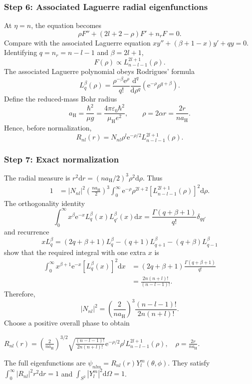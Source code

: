 \documentclass[11pt,a4paper]{article}
\newcommand{\key}[1]{\begin{resultbox}\centering\(\displaystyle #1\)\end{resultbox}}
\newcommand{\dd}{\mathrm{d}}
\newcommand{\ee}{\mathrm{e}}
\newcommand{\aH}{a_{\mathrm H}}
\newcommand{\mH}{\mu_{\mathrm H}}
\newcommand{\eps}{\varepsilon_0}
\begin{document}
\subsubsection*{Step 6: Associated Laguerre radial eigenfunctions}
At \(\eta=n\), the equation becomes
\begin{equation}\rho F''+(2l+2-\rho)F'+n_rF=0.\end{equation}
Compare with the associated Laguerre equation \(x y''+(\beta+1-x)y'+qy=0\). Identifying \(q=n_r=n-l-1\) and \(\beta=2l+1\),
\begin{equation}F(\rho)\propto L_{n-l-1}^{2l+1}(\rho).\end{equation}
The associated Laguerre polynomial obeys Rodrigues' formula
\begin{equation}L_q^\beta(\rho)=\frac{\rho^{-\beta}\ee^\rho}{q!}\frac{\dd^q}{\dd\rho^q}\left(\ee^{-\rho}\rho^{q+\beta}\right).\end{equation}
Define the reduced-mass Bohr radius
\begin{equation}\boxed{\aH=\frac{\hbar^2}{\mu g}=\frac{4\pi\eps\hbar^2}{\mH e^2},\qquad \rho=2\alpha r=\frac{2r}{n\aH}.}\end{equation}
Hence, before normalization,
\begin{equation}R_{nl}(r)=N_{nl}\rho^l\ee^{-\rho/2}L_{n-l-1}^{2l+1}(\rho).\end{equation}

\subsubsection*{Step 7: Exact normalization}
The radial measure is \(r^2\dd r=(n\aH/2)^3\rho^2\dd\rho\). Thus
\begin{align}
1&=|N_{nl}|^2\left(\frac{n\aH}{2}\right)^3\int_0^\infty\ee^{-\rho}\rho^{2l+2}[L_{n-l-1}^{2l+1}(\rho)]^2\dd\rho.
\end{align}
The orthogonality identity
\begin{equation}\int_0^\infty x^\beta\ee^{-x}L_q^\beta(x)L_{q'}^\beta(x)\dd x=\frac{\Gamma(q+\beta+1)}{q!}\delta_{qq'}\end{equation}
and recurrence
\begin{equation}xL_q^\beta=(2q+\beta+1)L_q^\beta-(q+1)L_{q+1}^\beta-(q+\beta)L_{q-1}^\beta\end{equation}
show that the required integral with one extra \(x\) is
\begin{align}
\int_0^\infty x^{\beta+1}\ee^{-x}[L_q^\beta(x)]^2\dd x&=(2q+\beta+1)\frac{\Gamma(q+\beta+1)}{q!}\\
&=\frac{2n(n+l)!}{(n-l-1)!}.
\end{align}
Therefore,
\begin{equation}|N_{nl}|^2=\left(\frac2{n\aH}\right)^3\frac{(n-l-1)!}{2n(n+l)!}.\end{equation}
Choose a positive overall phase to obtain
\key{\boxed{R_{nl}(r)=\left(\frac2{n\aH}\right)^{3/2}\sqrt{\frac{(n-l-1)!}{2n(n+l)!}}\ee^{-\rho/2}\rho^lL_{n-l-1}^{2l+1}(\rho),\quad\rho=\frac{2r}{n\aH}.}}
The full eigenfunctions are \(\psi_{nlm}=R_{nl}(r)Y_l^m(\theta,\phi)\). They satisfy \(\int_0^\infty|R_{nl}|^2r^2\dd r=1\) and \(\int_{S^2}|Y_l^m|^2\dd\Omega=1\).
\end{document}
